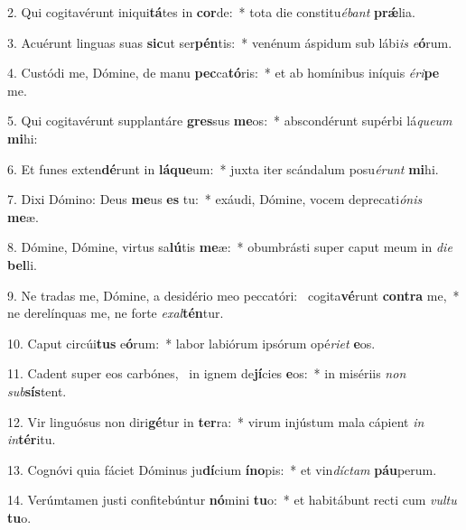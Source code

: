 2. Qui cogitavérunt iniqui\textbf{tá}tes in \textbf{cor}de:~*  tota die constitu\textit{é}\textit{bant} \textbf{prǽ}lia.\

3. Acuérunt linguas suas \textbf{sic}ut ser\textbf{pén}tis:~*  venénum áspidum sub lábi\textit{is} \textit{e}\textbf{ó}rum.\

4. Custódi me, Dómine, de manu \textbf{pec}ca\textbf{tó}ris:~*  et ab homínibus iníquis \textit{é}\textit{ri}\textbf{pe} me.\

5. Qui cogitavérunt supplantáre \textbf{gres}sus \textbf{me}os:~*  abscondérunt supérbi lá\textit{que}\textit{um} \textbf{mi}hi:\

6. Et funes exten\textbf{dé}runt in \textbf{lá}\textbf{que}um:~*  juxta iter scándalum posu\textit{é}\textit{runt} \textbf{mi}hi.\

7. Dixi Dómino: Deus \textbf{me}us \textbf{es} tu:~*  exáudi, Dómine, vocem deprecati\textit{ó}\textit{nis} \textbf{me}æ.\

8. Dómine, Dómine, virtus sa\textbf{lú}tis \textbf{me}æ:~*  obumbrásti super caput meum in \textit{di}\textit{e} \textbf{bel}li.\

9. Ne tradas me, Dómine, a desidério meo peccatóri: \dag\  cogita\textbf{vé}runt \textbf{con}\textbf{tra} me,~*  ne derelínquas me, ne forte \textit{ex}\textit{al}\textbf{tén}tur.\

10. Caput circúi\textbf{tus} e\textbf{ó}rum:~*  labor labiórum ipsórum opé\textit{ri}\textit{et} \textbf{e}os.\

11. Cadent super eos carbónes, \dag\  in ignem de\textbf{jí}cies \textbf{e}os:~*  in misériis \textit{non} \textit{sub}\textbf{sís}tent.\

12. Vir linguósus non diri\textbf{gé}tur in \textbf{ter}ra:~*  virum injústum mala cápient \textit{in} \textit{in}\textbf{tér}itu.\

13. Cognóvi quia fáciet Dóminus ju\textbf{dí}cium \textbf{ín}\textbf{o}pis:~*  et vin\textit{díc}\textit{tam} \textbf{páu}perum.\

14. Verúmtamen justi confitebúntur \textbf{nó}mini \textbf{tu}o:~*  et habitábunt recti cum \textit{vul}\textit{tu} \textbf{tu}o.\

